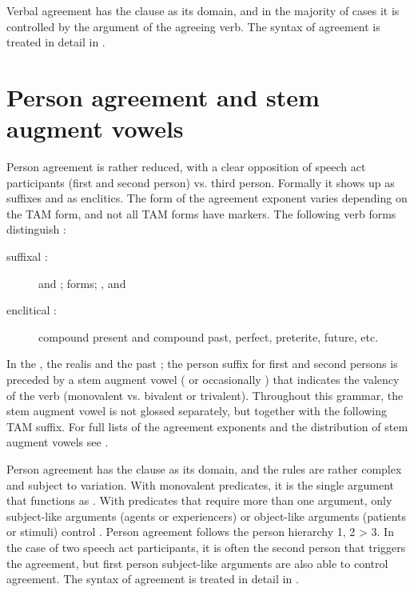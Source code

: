 Verbal  agreement has the clause as its domain, and in the majority of cases it is controlled by the  argument of the agreeing verb. The syntax of  agreement is treated in detail in .



\section{Person agreement and stem augment vowels}
\label{sec:Stem augment vowels and person agreement}

Person agreement is rather reduced, with a clear opposition of speech act participants (first and second person) vs. third person. Formally it shows up as suffixes and as enclitics. The form of the agreement exponent varies depending on the TAM form, and not all TAM forms have  markers. The following verb forms distinguish :
%
\begin{description}
	\item[suffixal :]  and ;  forms; ,  and 
	\item[enclitical :] compound present and compound past, perfect, preterite, future, etc.
\end{description}
%
In the , the realis  and the past ; the person suffix for first and second persons is preceded by a stem augment vowel ( or occasionally ) that indicates the valency of the verb (monovalent vs. bivalent or trivalent). Throughout this grammar, the stem augment vowel is not glossed separately, but together with the following TAM suffix. For full lists of the agreement exponents and the distribution of stem augment vowels see .

Person agreement has the clause as its domain, and the rules are rather complex and subject to variation. With monovalent predicates, it is the single argument that functions as . With predicates that require more than one argument, only subject-like arguments (agents or experiencers) or object-like arguments (patients or stimuli) control . Person agreement follows the person hierarchy 1, 2 > 3. In the case of two speech act participants, it is often the second person that triggers the agreement, but first person subject-like arguments are also able to control agreement. The syntax of  agreement is treated in detail in .


